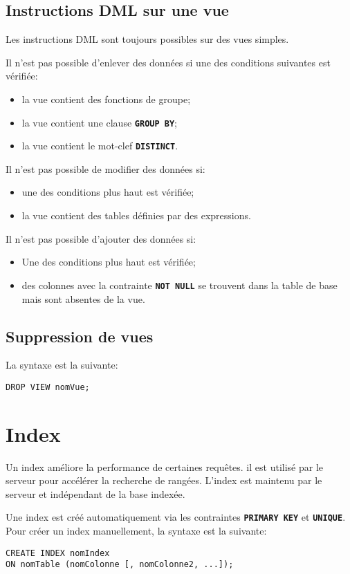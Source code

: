 \documentclass[a4paper, 12pt]{report}
\newcommand{\textSQL}[1]{\texttt{\textbf{#1}}}
\theoremstyle{definition} \newtheorem{ex}{Exemple}
\begin{document}
\section{Instructions DML sur une vue}
Les instructions DML sont toujours possibles sur des vues simples. 

Il n'est pas possible d'enlever des données si une des conditions suivantes est vérifiée:
\begin{itemize}
  \item la vue contient des fonctions de groupe;
	\item la vue contient une clause \textSQL{GROUP BY};
	\item la vue contient le mot-clef \textSQL{DISTINCT}.
\end{itemize}

Il n'est pas possible de modifier des données si:
\begin{itemize}
\item une des conditions plus haut est vérifiée;
\item la vue contient des tables définies par des expressions.
\end{itemize}

Il n'est pas possible d'ajouter des données si:
\begin{itemize}
  \item Une des conditions plus haut est vérifiée;
	\item des colonnes avec la contrainte \textSQL{NOT NULL} se trouvent dans la table de base mais sont absentes de la vue.
\end{itemize}

\section{Suppression de vues}
La syntaxe est la suivante:
\begin{lstlisting}[frame=single]
DROP VIEW nomVue;
\end{lstlisting}

\chapter{Index}
Un index améliore la performance de certaines requêtes. il est utilisé par le serveur pour accélérer la recherche de rangées. L'index est maintenu par le serveur et indépendant de la base indexée.

Une index est créé automatiquement via les contraintes \textSQL{PRIMARY KEY} et \textSQL{UNIQUE}. Pour créer un index manuellement, la syntaxe est la suivante:
\begin{lstlisting}[frame=single]
CREATE INDEX nomIndex
ON nomTable (nomColonne [, nomColonne2, ...]);
\end{lstlisting}
\end{document}
